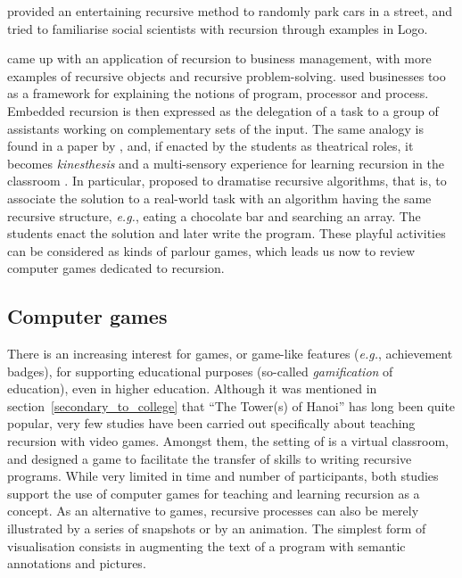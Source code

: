 \documentclass[11pt,a4paper]{article}
\newcommand\plang[1]{\textsf{#1}\xspace}
\begin{document}
\textcite{Wirth:2008} provided an entertaining recursive method to
randomly park cars in a street, and \textcite{Brown:1972} tried to
familiarise social scientists with recursion through examples in
\plang{Logo}.

\textcite{Schiemenz:2002} came up with an application of recursion to
business management, with more examples of recursive objects and
recursive problem\hyp{}solving. \textcite{Kimura:1977} used businesses
too as a framework for explaining the notions of program, processor
and process. Embedded recursion is then expressed as the delegation of
a task to a group of assistants working on complementary sets of the
input. The same analogy is found in a paper by
\textcite{Edgington:2007}, and, if enacted by the students as
theatrical roles, it becomes \emph{kinesthesis} and a
multi\hyp{}sensory experience for learning recursion in the classroom
\citep{Dorf:1992,Levine:2000,BegelGarciaWolfman:2004,Katai:2009}. In
particular, \textcite{Ben-AriReich:1996} proposed to dramatise
recursive algorithms, that is, to associate the solution to a
real\hyp{}world task with an algorithm having the same recursive
structure, \emph{e.g.}, eating a chocolate bar and searching an
array. The students enact the solution and later write the
program. These playful activities can be considered as kinds of
parlour games, which leads us now to review computer games dedicated
to recursion.

\subsection{Computer games} 

There is an increasing interest for games, or game\hyp{}like features
(\emph{e.g.}, achievement badges), for supporting educational purposes
(so-called \emph{gamification} of education), even in higher
education. Although it was mentioned in
section~\ref{secondary_to_college} that ``The Tower(s) of Hanoi'' has
long been quite popular, very few studies have been carried out
specifically about teaching recursion with video games. Amongst them,
the setting of \textcite{RossiouPapadakis:2007} is a virtual
classroom, and \textcite{ChaffinDoranHicksBarnes:2009} designed a game
to facilitate the transfer of skills to writing recursive
programs. While very limited in time and number of participants, both
studies support the use of computer games for teaching and learning
recursion as a concept. As an alternative to games, recursive
processes can also be merely illustrated by a series of snapshots or
by an animation. The simplest form of visualisation consists in
augmenting the text of a program with semantic annotations and
pictures.
\end{document}
